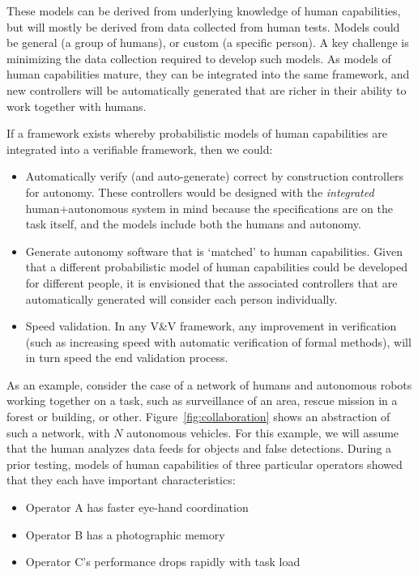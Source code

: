These models can be derived from underlying knowledge of human capabilities, but will mostly be derived from data collected from human tests. Models could be general (a group of humans), or custom (a specific person). A key challenge is minimizing the data collection required to develop such models.  As models of human capabilities mature, they can be integrated into the same framework, and new controllers will be automatically generated that are richer in their ability to work together with humans. 

If a framework exists whereby probabilistic models of human capabilities are integrated into a verifiable framework, then we could:
\vspace*{-0.1 in}
\begin{itemize}
\item Automatically verify (and auto-generate) correct by construction controllers for autonomy. These controllers would be designed with the {\it integrated} human+autonomous system in mind because the specifications are on the task itself, and the models include both the humans and autonomy.  \vspace*{-0.1 in}
\item Generate autonomy software that is `matched' to human capabilities. Given that a different probabilistic model of human capabilities could be developed for different people, it is envisioned that the associated controllers that are automatically generated will consider each person individually. \vspace*{-0.1 in}
\item Speed validation. In any V\&V framework, any improvement in verification (such as increasing speed with automatic verification of formal methods), will in turn speed the end validation process.  \vspace*{-0.1 in}
\end{itemize}

As an example, consider the case of a network of humans and autonomous robots working together on a task, such as surveillance of an area, rescue mission in a forest or building, or other. Figure~\ref{fig:collaboration} shows an abstraction of such a network, with $N$ autonomous vehicles. For this example, we will assume that the human analyzes data feeds for objects and false detections. During a prior testing, models of human capabilities of three particular operators showed that they each have important characteristics:\vspace*{-0.1 in}
\begin{itemize}
\item Operator A has faster eye-hand coordination\vspace*{-0.1 in}
\item Operator B has a photographic memory\vspace*{-0.1 in}
\item Operator C's performance drops rapidly with task load\vspace*{-0.1 in}
\end{itemize}

